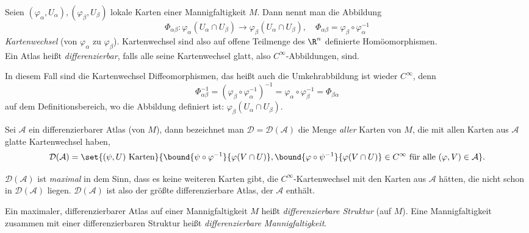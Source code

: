 \begin{defn}[Kartenwechsel]
	Seien $ (\varphi_\alpha,U_\alpha), (\varphi_\beta,U_\beta) $ lokale Karten einer Mannigfaltigkeit $M$. Dann nennt man die Abbildung
	\[ \Phi_{\alpha\beta}: \varphi_\alpha(U_\alpha \cap U_\beta) \to \varphi_\beta(U_\alpha \cap U_\beta),\quad \Phi_{\alpha\beta} = \varphi_\beta \circ \varphi_\alpha^{-1} \]
	\emph{Kartenwechsel} (von $ \varphi_\alpha $ zu $\varphi_\beta$). Kartenwechsel sind also auf offene Teilmenge des $\R^n$ definierte Homöomorphismen.\\
	Ein Atlas heißt \emph{differenzierbar}, falls alle seine Kartenwechsel glatt, also $C^\infty$-Abbildungen, sind.
\end{defn}

\begin{rem*}
	In diesem Fall sind die Kartenwechsel Diffeomorphismen, das heißt auch die Umkehrabbildung ist wieder $C^\infty$, denn
	\[ \Phi_{\alpha\beta}^{-1} = \left(\varphi_\beta \circ \varphi_\alpha^{-1}\right)^{-1} = \varphi_\alpha \circ \varphi_\beta^{-1} = \Phi_{\beta\alpha} \]
	auf dem Definitionsbereich, wo die Abbildung definiert ist: $ \varphi_\beta(U_\alpha \cap U_\beta). $
\end{rem*}

\begin{defn}
	Sei $\mathcal{A}$ ein differenzierbarer Atlas (von $M$), dann bezeichnet man $\mathcal{D} = \mathcal{D}(\mathcal{A})$ die Menge \emph{aller} Karten von $M$, die mit allen Karten aus $\mathcal{A}$ glatte Kartenwechsel haben,
	\[ \mathcal{D}(\mathcal{A}) = \set{(\psi,U) \ \text{Karten}}{\bound{\psi \circ \varphi^{-1}}{\varphi(V \cap U)}, \bound{\varphi \circ \psi^{-1}}{\varphi(V \cap U)} \in C^\infty \ \text{für alle } (\varphi,V) \in \mathcal{A}}. \]
	\begin{rem*}
		$\mathcal{D}(\mathcal{A})$ ist \emph{maximal} in dem Sinn, dass es keine weiteren Karten gibt, die $C^\infty$-Kartenwechsel mit den Karten aus $\mathcal{A}$ hätten, die nicht schon in $\mathcal{D}(\mathcal{A})$ liegen. $\mathcal{D}(\mathcal{A})$ ist also der größte differenzierbare Atlas, der $\mathcal{A}$ enthält.
	\end{rem*}
	\begin{notat*}
		Ein maximaler, differenzierbarer Atlas auf einer Mannigfaltigkeit $M$ heißt \emph{differenzierbare Struktur} (auf $M$). Eine Mannigfaltigkeit zusammen mit einer differenzierbaren Struktur heißt \emph{differenzierbare Mannigfaltigkeit}.
	\end{notat*}
\end{defn}

